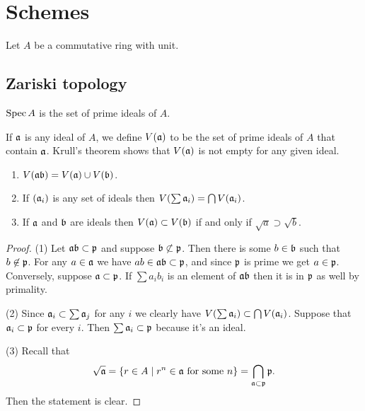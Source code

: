 \section{Schemes}

Let $A$ be a commutative ring with unit.


\subsection*{Zariski topology}

\begin{defi}
$\operatorname{Spec} A$ is the set of prime ideals of $A$.
\end{defi}

If $\mathfrak{a}$ is any ideal of $A$, we define $V(\mathfrak{a})$ to be the set of prime ideals of $A$ that contain $\mathfrak{a}$.
Krull's theorem shows that $V(\mathfrak{a})$ is not empty for any given ideal.


\begin{prop}
\begin{enumerate}
\item
$V(\mathfrak{a} \mathfrak{b}) = V(\mathfrak{a}) \cup V(\mathfrak{b})$.

\item
If $(\mathfrak{a}_i)$ is any set of ideals then $V(\sum \mathfrak{a}_i) = \bigcap V(\mathfrak{a}_i)$.

\item
If $\mathfrak{a}$ and $\mathfrak{b}$ are ideals then $V(\mathfrak{a}) \subset V(\mathfrak{b})$ if and only if $\sqrt a \supset \sqrt b$.
\end{enumerate}
\end{prop}

\begin{proof}
(1) Let $\mathfrak{a} \mathfrak{b} \subset \mathfrak{p}$ and suppose $\mathfrak{b} \not\subset \mathfrak{p}$.
Then there is some $b \in \mathfrak{b}$ such that $b \not\in \mathfrak{p}$.
For any $a \in \mathfrak{a}$ we have $ab \in \mathfrak{a} \mathfrak{b} \subset \mathfrak{p}$, and since $\mathfrak{p}$ is prime we get $a \in \mathfrak{p}$.
Conversely, suppose $\mathfrak{a} \subset \mathfrak{p}$.
If $\sum a_i b_i$ is an element of $\mathfrak{a} \mathfrak{b}$ then it is in $\mathfrak{p}$ as well by primality.

(2) Since $\mathfrak{a}_i \subset \sum \mathfrak{a}_j$ for any $i$ we clearly have $V(\sum \mathfrak{a}_i) \subset \bigcap V(\mathfrak{a}_i)$.
Suppose that $\mathfrak{a}_i \subset \mathfrak{p}$ for every $i$.
Then $\sum \mathfrak{a}_i \subset \mathfrak{p}$ because it's an ideal.

(3) Recall that 
\[
\sqrt \ff a = \{ r \in A \mid r^n \in \ff a \text{ for some $n$}\}
= \bigcap_{\ff a \subset \ff p} \ff p.
\]
Then the statement is clear.
\end{proof}


